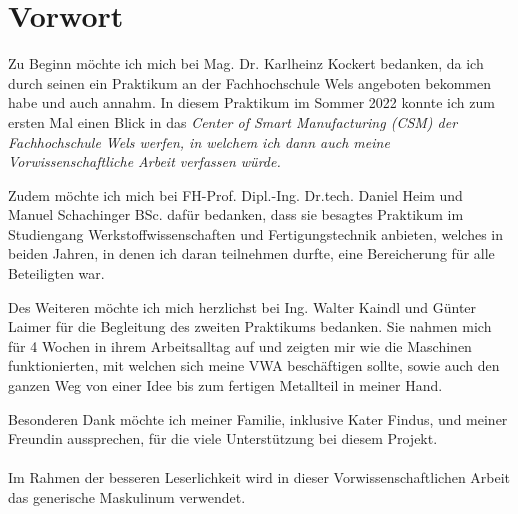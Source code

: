 \documentclass[../main.tex]{subfiles}
\begin{document}
\section*{Vorwort}
Zu Beginn möchte ich mich bei Mag. Dr. Karlheinz Kockert bedanken, da ich durch seinen  ein Praktikum an der Fachhochschule Wels angeboten bekommen habe und auch annahm. In diesem Praktikum im Sommer 2022 konnte ich zum ersten Mal einen Blick in das \it{Center of Smart Manufacturing (CSM)} der Fachhochschule Wels werfen, in welchem ich dann auch meine Vorwissenschaftliche Arbeit verfassen würde. 

Zudem möchte ich mich bei FH-Prof. Dipl.-Ing. Dr.tech. Daniel Heim und Manuel Schachinger BSc. dafür bedanken, dass sie besagtes Praktikum im Studiengang Werkstoffwissenschaften und Fertigungstechnik anbieten, welches in beiden Jahren, in denen ich daran teilnehmen durfte, eine Bereicherung für alle Beteiligten war.

Des Weiteren möchte ich mich herzlichst bei Ing. Walter Kaindl und  Günter Laimer für die Begleitung des zweiten Praktikums bedanken. Sie nahmen mich für 4 Wochen in ihrem Arbeitsalltag auf und zeigten mir wie die Maschinen funktionierten, mit welchen sich meine VWA beschäftigen sollte, sowie auch den ganzen Weg von einer Idee bis zum fertigen Metallteil in meiner Hand.

Besonderen Dank möchte ich meiner Familie, inklusive Kater Findus, und meiner Freundin aussprechen, für die viele Unterstützung bei diesem Projekt.
\\\\
Im Rahmen der besseren Leserlichkeit wird in dieser Vorwissenschaftlichen Arbeit das generische Maskulinum verwendet.
\end{document}
